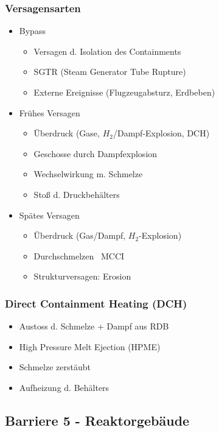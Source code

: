 \documentclass[12pt]{article}
\begin{document}
\subsubsection{Versagensarten}
\begin{itemize}
  \item Bypass
  \begin{itemize}
    \item Versagen d. Isolation des Containments
    \item SGTR (Steam Generator Tube Rupture)
    \item Externe Ereignisse (Flugzeugabsturz, Erdbeben)
  \end{itemize}
  \item Frühes Versagen
  \begin{itemize}
    \item Überdruck (Gase, \(H_2\)/Dampf-Explosion, DCH)
    \item Geschosse durch Dampfexplosion
    \item Wechselwirkung m. Schmelze
    \item Stoß d. Druckbehälters
  \end{itemize}
  \item Spätes Versagen
  \begin{itemize}
    \item Überdruck (Gas/Dampf, \(H_2\)-Explosion)
    \item Durchschmelzen \textrightarrow\ MCCI
    \item Strukturversagen: Erosion
  \end{itemize}
\end{itemize}

\subsubsection{Direct Containment Heating (DCH)}
\begin{itemize}
  \item Austoss d. Schmelze + Dampf aus RDB
  \item High Pressure Melt Ejection (HPME)
  \item Schmelze zerstäubt
  \item Aufheizung d. Behälters
\end{itemize}

\subsection{Barriere 5 - Reaktorgebäude}
\end{document}
